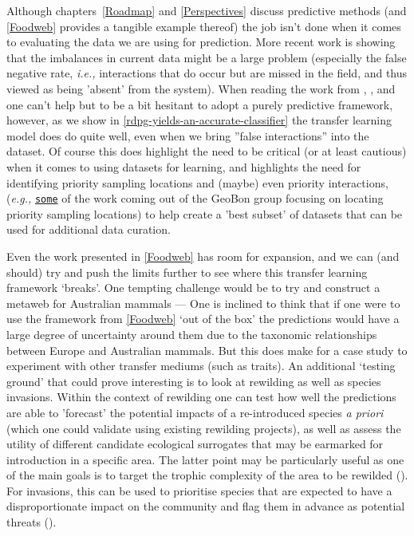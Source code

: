 \begin{refsection}
Although chapters~\ref{Roadmap} and \ref{Perspectives} discuss predictive methods (and \autoref{Foodweb} provides a tangible example thereof) the job isn't done when it comes to evaluating the data we are using for prediction. More recent work is showing that the imbalances in current data might be a large problem (especially the false negative rate, \emph{i.e.,} interactions that do occur but are missed in the field, and thus viewed as being 'absent' from the system). When reading the work from \cite{Brimacombe2023Shortcomings}, \cite{Catchen2023Missing}, and \cite{Poisot2023Guidelines} one can't help but to be a bit hesitant to adopt a purely predictive framework, however, as we show in \autoref{rdpg-yields-an-accurate-classifier} the transfer learning model does do quite well, even when we bring ''false interactions'' into the dataset. Of course this does highlight the need to be critical (or at least cautious) when it comes to using datasets for learning, and highlights the need for identifying priority sampling locations and (maybe) even priority interactions, (\emph{e.g.,} \href{https://github.com/EcoJulia/BiodiversityObservationNetworks.jl/tree/main}{\texttt{some}} of the work coming out of the GeoBon group focusing on locating priority sampling locations) to help create a 'best subset' of datasets that can be used for additional data curation.

Even the work presented in \autoref{Foodweb} has room for expansion, and we can (and should) try and push the limits further to see where this transfer learning framework `breaks'. One tempting challenge would be to try and construct a metaweb for Australian mammals --- One is inclined to think that if one were to use the framework from \autoref{Foodweb} `out of the box' the predictions would have a large degree of uncertainty around them due to the taxonomic relationships between Europe and Australian mammals. But this does make for a case study to experiment with other transfer mediums (such as traits). An additional `testing ground' that could prove interesting is to look at rewilding as well as species invasions. Within the context of rewilding one can test how well the predictions are able to 'forecast' the potential impacts of a re-introduced species \emph{a priori} (which one could validate using existing rewilding projects), as well as assess the utility of different candidate ecological surrogates that may be earmarked for introduction in a specific area. The latter point may be particularly useful as one of the main goals is to target the trophic complexity of the area to be rewilded (\cite{Perino2019Rewilding}). For invasions, this can be used to prioritise species that are expected to have a disproportionate impact on the community and flag them in advance as potential threats (\cite{David2017Chapter}).


\end{refsection}
